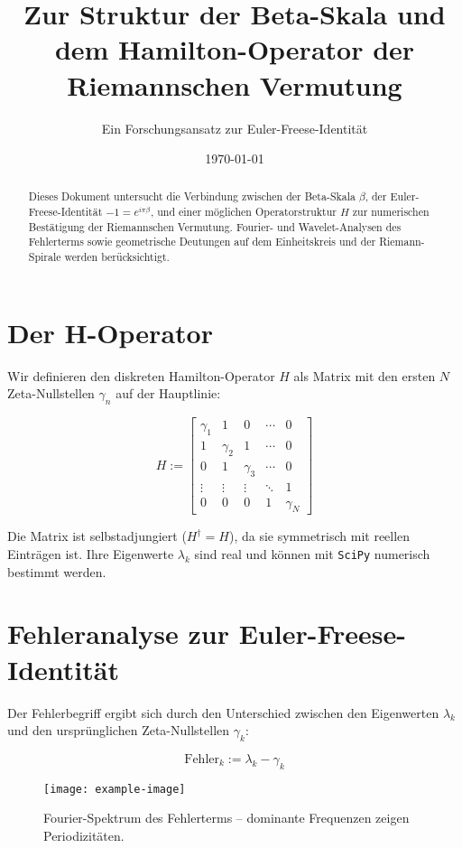 \documentclass[12pt]{article}
\title{\textbf{Zur Struktur der Beta-Skala und dem Hamilton-Operator der Riemannschen Vermutung}}
\author{Ein Forschungsansatz zur Euler-Freese-Identität}
\date{\today}
\begin{document}
\maketitle

\begin{abstract}
Dieses Dokument untersucht die Verbindung zwischen der Beta-Skala $ \beta $, der Euler-Freese-Identität $ -1 = e^{i \pi \beta} $, und einer möglichen Operatorstruktur $ H $ zur numerischen Bestätigung der Riemannschen Vermutung. Fourier- und Wavelet-Analysen des Fehlerterms sowie geometrische Deutungen auf dem Einheitskreis und der Riemann-Spirale werden berücksichtigt.
\end{abstract}

\section{Der H-Operator}
Wir definieren den diskreten Hamilton-Operator $H$ als Matrix mit den ersten $N$ Zeta-Nullstellen $\gamma_n$ auf der Hauptlinie:

\[
H := \begin{bmatrix}
\gamma_1 & 1 & 0 & \cdots & 0 \\
1 & \gamma_2 & 1 & \cdots & 0 \\
0 & 1 & \gamma_3 & \cdots & 0 \\
\vdots & \vdots & \vdots & \ddots & 1 \\
0 & 0 & 0 & 1 & \gamma_N
\end{bmatrix}
\]

Die Matrix ist selbstadjungiert ($H^\dagger = H$), da sie symmetrisch mit reellen Einträgen ist. Ihre Eigenwerte $\lambda_k$ sind real und können mit \texttt{SciPy} numerisch bestimmt werden.

\section{Fehleranalyse zur Euler-Freese-Identität}
Der Fehlerbegriff ergibt sich durch den Unterschied zwischen den Eigenwerten $\lambda_k$ und den ursprünglichen Zeta-Nullstellen $\gamma_k$:

\[
\text{Fehler}_k := \lambda_k - \gamma_k
\]

\begin{figure}[H]
\centering
\texttt{[image: example-image]} %
\caption{Fourier-Spektrum des Fehlerterms – dominante Frequenzen zeigen Periodizitäten.}
\end{figure}
\end{document}

